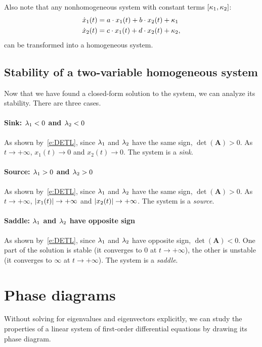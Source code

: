 \documentclass[letterpaper, 11pt, leqno]{article}
\begin{document}
Also note that any nonhomogeneous system with constant terms $\left[ \kappa_{1},\kappa_{2} \right]$:
\begin{align*}
\dot{x}_{1}(t) &=a\cdot x_{1}(t)+b\cdot x_{2}(t)+\kappa_{1} \\
\dot{x}_{2}(t) &=c\cdot x_{1}(t)+d\cdot x_{2}(t)+\kappa_{2},
\end{align*}
can be transformed into a homogeneous system.

\subsection{Stability of a two-variable homogeneous system}

Now that we have found a closed-form solution to the system, we can analyze its stability. There are three cases.

\paragraph{Sink: $\lambda_{1}<0$ and $\lambda_{2}<0$} As shown by~\eqref{e:DETL}, since $\lambda_{1}$ and $\lambda_{2}$ have the same sign, $\det(\bm{A}) >0$. As $t\to +\infty$, $x_{1}(t)\to 0$ and $x_{2}(t)\to 0$. The system is a \textit{sink}.

\paragraph{Source: $\lambda_{1}>0$ and $\lambda_{2}>0$} As shown by~\eqref{e:DETL}, since $\lambda_{1}$ and $\lambda_{2}$ have the same sign, $\det(\bm{A}) >0$. As $t\to +\infty$, $\left\lvert x_{1}(t) \right\rvert\to +\infty$ and $\left\lvert x_{2}(t) \right\rvert\to +\infty$. The system is a \textit{source}.

\paragraph{Saddle: $\lambda_{1}$ and $\lambda_{2}$ have opposite sign} As shown by~\eqref{e:DETL}, since $\lambda_{1}$ and $\lambda_{2}$ have opposite sign, $\det(\bm{A}) <0$. One part of the solution is stable (it converges to 0 at $t\to +\infty$), the other is unstable (it converges to $\infty$ at $t\to +\infty$). The system is a \textit{saddle}.


\section{Phase diagrams}\label{s:three}

Without solving for eigenvalues and eigenvectors explicitly, we can study the properties of a linear system of first-order differential equations by drawing its phase diagram. 
\end{document}

